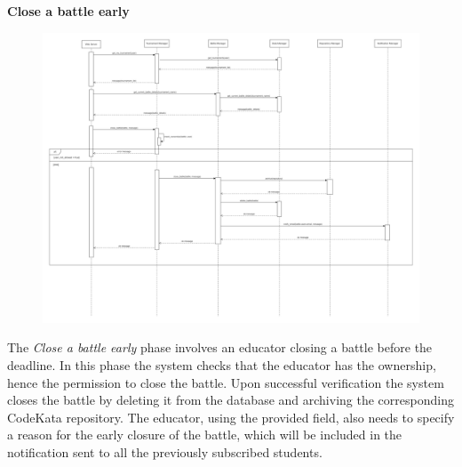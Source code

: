 \documentclass[../DD.tex]{subfiles}
\begin{document}
    \textbf{Close a battle early}\\
    \begin{figure}[H]
        \centering
        \hspace*{-3cm}
        \includegraphics[width=1.4\textwidth]{../assets/section_2/CloseABattle.png}
    \end{figure}
    \newpage
    The \textit{Close a battle early} phase involves an educator closing a battle before the deadline.
    In this phase the system checks that the educator has the ownership, hence the permission to close the battle.
    Upon successful verification the system closes the battle by deleting it from the database and archiving the corresponding CodeKata repository.
    The educator, using the provided field, also needs to specify a reason for the early closure of the battle, which will be included in the notification sent to all the previously subscribed students.
    \newpage
\end{document}
